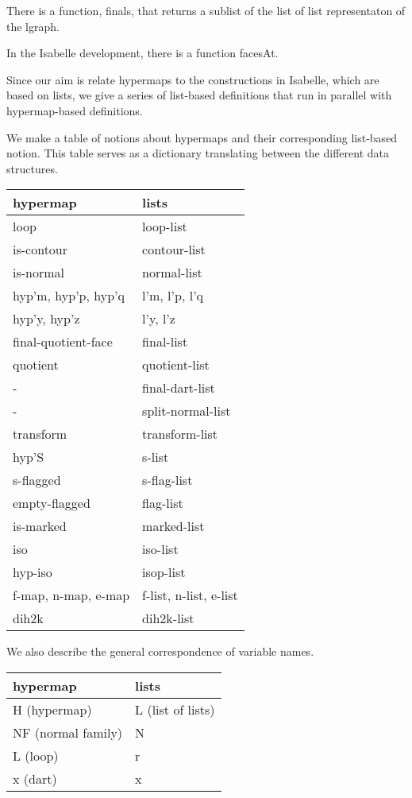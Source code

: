 There is a function, finals, that returns a sublist of the
list of list representaton of the lgraph.

In the Isabelle development, there is a function facesAt.



Since our aim is relate hypermaps to the constructions in Isabelle, which
are based on lists, we give a series of list-based definitions that run
in parallel with hypermap-based definitions.

We make a table of notions about hypermaps and their corresponding list-based notion.
This table serves as a dictionary translating between the different data structures.

\bigskip
\begin{tabular}{l l}
\hline
{\bf hypermap} & {\bf lists} \\ \hline
loop & loop-list \\
is-contour & contour-list \\
is-normal & normal-list \\
hyp'm, hyp'p, hyp'q & l'm, l'p, l'q \\
hyp'y, hyp'z & l'y, l'z \\
final-quotient-face   & final-list \\
quotient & quotient-list \\
- & final-dart-list \\
- & split-normal-list \\
transform & transform-list \\
hyp'S & s-list \\
s-flagged & s-flag-list \\
empty-flagged & flag-list \\
is-marked & marked-list \\
iso & iso-list \\
hyp-iso & isop-list \\
f-map, n-map, e-map & f-list, n-list, e-list\\
dih2k & dih2k-list\\
\hline
\end{tabular}

\bigskip
We also describe the general correspondence of variable names.

\begin{tabular}{l l}
\hline
{\bf hypermap} & {\bf lists} \\ \hline
H (hypermap) & L (list of lists)\\
NF (normal family) & N \\
L (loop) & r \\
x (dart) & x \\
\hline
\end{tabular}


